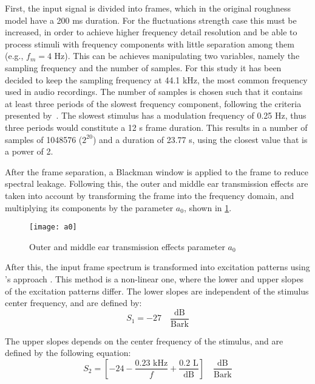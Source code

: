 \documentclass[../main.tex]{subfiles}
\begin{document}
\begin{modelchapter}
First, the input signal is divided into frames, which in the original roughness
model have a 200 ms duration. For the fluctuations strength case this must be
increased, in order to achieve higher frequency detail resolution and be able
to process stimuli with frequency components with little separation among them
(e.g., $f_m = 4$ Hz). This can be achieves manipulating two variables, namely
the sampling frequency and the number of samples. For this study it has been
decided to keep the sampling frequency at 44.1 kHz, the most common frequency
used in audio recordings. The number of samples is chosen such that it contains
at least three periods of the slowest frequency component, following the
criteria presented by~\cite[pp.~97]{Boersma1993}. The slowest stimulus has a
modulation frequency of 0.25 Hz, thus three periods would constitute a 12 s
frame duration. This results in a number of samples of 1048576 ($2^{20}$) and a
duration of 23.77 s, using the closest value that is a power of 2.

After the frame separation, a Blackman window is applied to the frame to reduce
spectral leakage. Following this, the outer and middle ear transmission effects
are taken into account by transforming the frame into the frequency domain, and
multiplying its components by the parameter $a_0$, shown in \cref{fig:a0}.

\begin{figure}[!ht]
  \centering
  \texttt{[image: a0]}
  \caption{Outer and middle ear transmission effects parameter $a_0$}
  \label{fig:a0}
\end{figure}

After this, the input frame spectrum is transformed into excitation patterns
using \citeauthor{Terhardt1979}'s approach \cite{Terhardt1979}. This method is a
non-linear one, where the lower and upper slopes of the excitation patterns
differ. The lower slopes are independent of the stimulus center frequency, and
are defined by:
\begin{equation}
  S_1 = -27 \quad \frac{\text{dB}}{\text{Bark}}
  \label{eq:lower_slopes}
\end{equation}

The upper slopes depends on the center frequency of the stimulus, and are
defined by the following equation:
\begin{equation}
  S_2 = [-24-\frac{0.23 \text{ kHz}}{f}+\frac{0.2 \text{ L}}{\text{dB}}]
  \quad
  \frac{\text{dB}}{\text{Bark}}
\end{equation}


\end{modelchapter}
\end{document}
